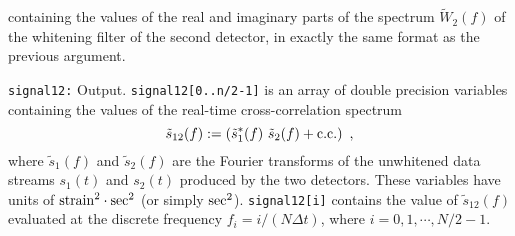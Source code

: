 \begin{description}
containing the values of the real and imaginary parts of the spectrum 
$\tilde W_2(f)$ of the whitening filter of the second detector,
in exactly the same format as the previous argument.
%
\item{\tt signal12:} Output.
{\tt signal12[0..n/2-1]} is an array of double precision variables
containing the values of the real-time cross-correlation spectrum 
%
\begin{equation}
\tilde s_{12}(f):=\left(\tilde s_1^*(f)\ \tilde s_2(f) + {\rm c.c.}\right)\ ,
\end{equation}
%
where $\tilde s_1(f)$ and $\tilde s_2(f)$ are the Fourier transforms
of the unwhitened data streams $s_1(t)$ and $s_2(t)$ produced by the
two detectors.
These variables have units of ${\rm strain}^2\cdot{\rm sec}^2$ 
(or simply ${\rm sec}^2$).
{\tt signal12[i]} contains the value of $\tilde s_{12}(f)$ evaluated
at the discrete frequency $f_i=i/(N\Delta t)$, where $i=0,1,\cdots,N/2-1$.
\end{description}

